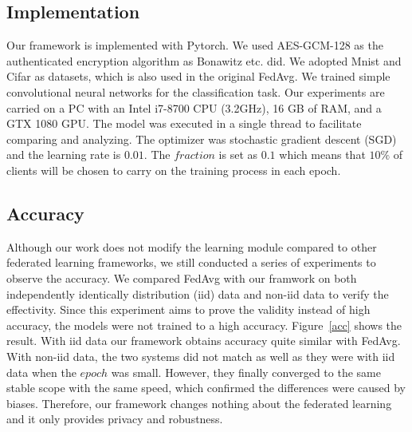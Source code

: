\subsection{Implementation}
Our framework is implemented with Pytorch. We used AES-GCM-128 as the authenticated encryption algorithm as Bonawitz etc. did\cite{Practical}. We adopted Mnist and Cifar as datasets, which is also used in the original FedAvg\cite{mcmahan2016communicationefficient}. We trained simple convolutional neural networks for the classification task. Our experiments are carried on a PC with an Intel i7-8700 CPU (3.2GHz), 16 GB of RAM, and a GTX 1080 GPU. The model was executed in a single thread to facilitate comparing and analyzing. The optimizer was stochastic gradient descent (SGD) and the learning rate is $0.01$. The $fraction$ is set as $0.1$ which means that $10\%$ of clients will be chosen to carry on the training process in each epoch.


\subsection{Accuracy}
Although our work does not modify the learning module compared to other federated learning frameworks, we still conducted a series of experiments to observe the accuracy. We compared FedAvg with our framwork on both independently identically distribution (iid) data and non-iid data to verify the effectivity. Since this experiment aims to prove the validity instead of high accuracy, the models were not trained to a high accuracy. Figure~\ref{acc} shows the result. With iid data our framework obtains accuracy quite similar with FedAvg. With non-iid data, the two systems did not match as well as they were with iid data when the $epoch$ was small. However, they finally converged to the same stable scope with the same speed, which confirmed the differences were caused by biases. Therefore, our framework changes nothing about the federated learning and it only provides privacy and robustness. 

